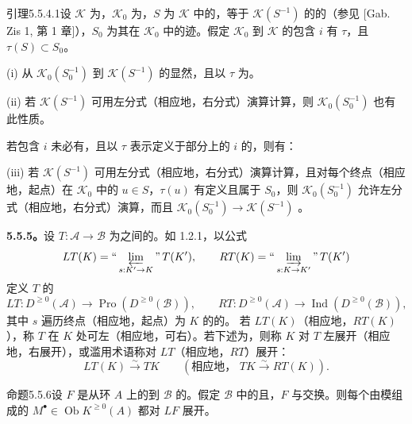 \begin{SGAresult}{引理}{5.5.4.1}设 $\mathscr K$ 为，$\mathscr K_0$ 为，$S$ 为 $\mathscr K$ 中的，等于 $\mathscr K(S^{-1})$ 的的（参见 [Gab. Zis 1, 第 1 章]），$S_0$ 为其在 $\mathscr K_0$ 中的迹。假定 $\mathscr K_0$ 到 $\mathscr K$ 的包含 $i$ 有 $\tau$，且 $\tau(S)\subset S_0$。

(i) 从 $\mathscr K_0(S_0^{-1})$ 到 $\mathscr K(S^{-1})$ 的显然，且以 $\tau$ 为。

(ii) 若 $\mathscr K(S^{-1})$ 可用左分式（相应地，右分式）演算计算，则 $\mathscr K_0(S_0^{-1})$ 也有此性质。

若包含 $i$ 未必有，且以 $\tau$ 表示定义于部分上的 $i$ 的，则有：

(iii) 若 $\mathscr K(S^{-1})$ 可用左分式（相应地，右分式）演算计算，且对每个终点（相应地，起点）在 $\mathscr K_0$ 中的 $u\in S$，$\tau(u)$ 有定义且属于 $S_0$，则 $\mathscr K_0(S_0^{-1})$ 允许左分式（相应地，右分式）演算，而且 $\mathscr K_0(S_0^{-1})\to\mathscr K(S^{-1})$ 。
\end{SGAresult}
\textbf{5.5.5。}设 $T:\mathscr A\to\mathscr B$ 为之间的。如 1.2.1，以公式
\[LT(K)=\text{“}\varprojlim_{s:K'\to K}\text{”}\,T(K'),\qquad RT(K)=\text{“}\varinjlim_{s:K\to K'}\text{”}\,T(K')\]
定义 $T$ 的
\[LT:D^{\geq0}(\mathscr A)\longrightarrow\operatorname{Pro}(D^{\geq0}(\mathscr B)),\qquad RT:D^{\geq0}(\mathscr A)\longrightarrow\operatorname{Ind}(D^{\geq0}(\mathscr B)),\]
其中 $s$ 遍历终点（相应地，起点）为 $K$ 的的。
若 $LT(K)$（相应地，$RT(K)$），称 $T$ 在 $K$ 处可左（相应地，可右）。若下述为，则称 $K$ 对 $T$ 左展开（相应地，右展开），或滥用术语称对 $LT$（相应地，$RT$）展开：
\[LT(K)\xrightarrow\sim TK\qquad(\text{相应地， }TK\xrightarrow\sim RT(K)).\]
\begin{SGAresult}{命题}{5.5.6}设 $F$ 是从环 $A$ 上的到 $\mathscr B$ 的。假定 $\mathscr B$ 中的且，$F$ 与交换。则每个由模组成的 $M^\bullet\in\operatorname{Ob}K^{\geq0}(A)$ 都对 $LF$ 展开。\end{SGAresult}
